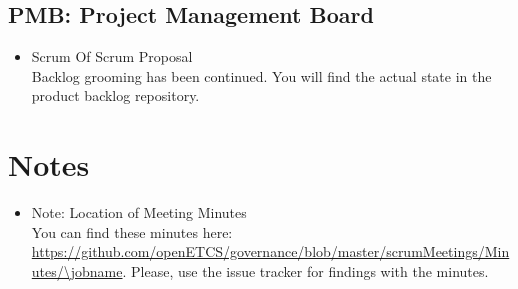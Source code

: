 \documentclass[a4paper, 11pt]{article}
\begin{document}
\subsection{PMB: Project Management Board}
\begin{itemize}

\item Scrum Of Scrum Proposal\\
Backlog grooming has been continued. You will find the actual state in the product backlog repository.

\end{itemize}

\section{Notes}
\begin{itemize}

\item Note: Location of Meeting Minutes\\
You can find these minutes here: \url{https://github.com/openETCS/governance/blob/master/scrumMeetings/Minutes/\jobname}. Please, use the issue tracker for findings with the minutes.

\end{itemize}
\end{document}
